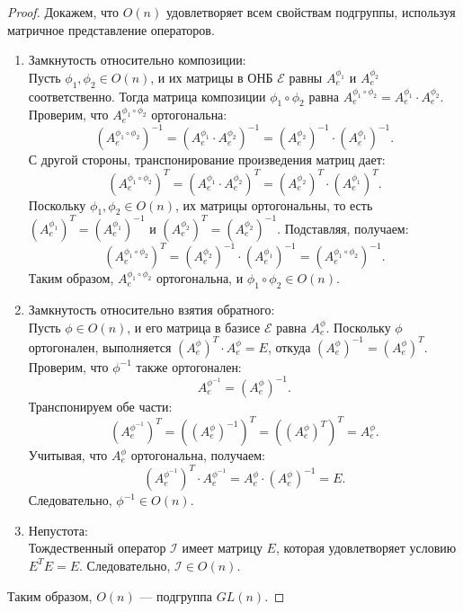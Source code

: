 \begin{proof}
    Докажем, что \( O(n) \) удовлетворяет всем свойствам подгруппы, используя матричное представление операторов.
    
\begin{enumerate}
    \item Замкнутость относительно композиции: \\
    Пусть \( \phi_1, \phi_2 \in O(n) \), и их матрицы в ОНБ \( \mathcal{E} \) равны \( A_e^{\phi_1} \) и \( A_e^{\phi_2} \) соответственно. Тогда матрица композиции \( \phi_1 \circ \phi_2 \) равна \( A_e^{\phi_1 \circ \phi_2} = A_e^{\phi_1} \cdot A_e^{\phi_2} \). Проверим, что \( A_e^{\phi_1 \circ \phi_2} \) ортогональна:
    \[
    (A_e^{\phi_1 \circ \phi_2})^{-1} = (A_e^{\phi_1} \cdot A_e^{\phi_2})^{-1} = (A_e^{\phi_2})^{-1} \cdot (A_e^{\phi_1})^{-1}.
    \]
    С другой стороны, транспонирование произведения матриц дает:
    \[
    (A_e^{\phi_1 \circ \phi_2})^T = (A_e^{\phi_1} \cdot A_e^{\phi_2})^T = (A_e^{\phi_2})^T \cdot (A_e^{\phi_1})^T.
    \]
    Поскольку \( \phi_1, \phi_2 \in O(n) \), их матрицы ортогональны, то есть \( (A_e^{\phi_1})^T = (A_e^{\phi_1})^{-1} \) и \( (A_e^{\phi_2})^T = (A_e^{\phi_2})^{-1} \). Подставляя, получаем:
    \[
    (A_e^{\phi_1 \circ \phi_2})^T = (A_e^{\phi_2})^{-1} \cdot (A_e^{\phi_1})^{-1} = (A_e^{\phi_1 \circ \phi_2})^{-1}.
    \]
    Таким образом, \( A_e^{\phi_1 \circ \phi_2} \) ортогональна, и \( \phi_1 \circ \phi_2 \in O(n) \).

    \item Замкнутость относительно взятия обратного: \\
    Пусть \( \phi \in O(n) \), и его матрица в базисе \( \mathcal{E} \) равна \( A_e^{\phi} \). Поскольку \( \phi \) ортогонален, выполняется \( (A_e^{\phi})^T \cdot A_e^{\phi} = E \), откуда \( (A_e^{\phi})^{-1} = (A_e^{\phi})^T \). Проверим, что \( \phi^{-1} \) также ортогонален:
    \[
    A_e^{\phi^{-1}} = (A_e^{\phi})^{-1}.
    \]
    Транспонируем обе части:
    \[
    (A_e^{\phi^{-1}})^T = ((A_e^{\phi})^{-1})^T = ((A_e^{\phi})^T)^T = A_e^{\phi}.
    \]
    Учитывая, что \( A_e^{\phi} \) ортогональна, получаем:
    \[
    (A_e^{\phi^{-1}})^T \cdot A_e^{\phi^{-1}} = A_e^{\phi} \cdot (A_e^{\phi})^{-1} = E.
    \]
    Следовательно, \( \phi^{-1} \in O(n) \).

    \item Непустота: \\
    Тождественный оператор \( \mathcal{I} \) имеет матрицу \( E \), которая удовлетворяет условию \( E^T E = E \). Следовательно, \( \mathcal{I} \in O(n) \).
\end{enumerate}

Таким образом, \( O(n) \) — подгруппа \( GL(n) \).
\end{proof}
